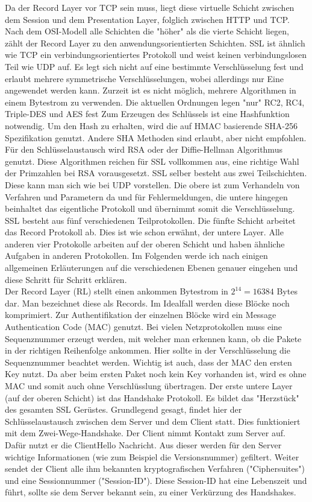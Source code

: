 Da der Record Layer vor TCP sein muss, liegt diese virtuelle Schicht zwischen dem Session und dem Presentation Layer, folglich zwischen HTTP und TCP. Nach dem OSI-Modell alle Schichten die "höher" als die vierte Schicht liegen, zählt der Record Layer zu den anwendungsorientierten Schichten. SSL ist ähnlich wie TCP ein verbindungsorientiertes Protokoll und weist keinen verbindungslosen Teil wie UDP auf. Es legt sich nicht auf eine bestimmte Verschlüsselung fest und erlaubt mehrere symmetrische Verschlüsselungen, wobei allerdings nur Eine angewendet werden kann. Zurzeit ist es nicht möglich, mehrere Algorithmen in einem Bytestrom zu verwenden. Die aktuellen Ordnungen legen "nur" RC2, RC4, Triple-DES und AES fest Zum Erzeugen des Schlüssels ist eine Hashfunktion notwendig. Um den Hash zu erhalten, wird die auf HMAC basierende SHA-256 Spezifikation genutzt. Andere SHA Methoden sind erlaubt, aber nicht empfohlen. Für den Schlüsselaustausch wird RSA oder der Diffie-Hellman Algorithmus genutzt. Diese Algorithmen reichen für SSL vollkommen aus, eine richtige Wahl der Primzahlen bei RSA vorausgesetzt. SSL selber besteht aus zwei Teilschichten. Diese kann man sich wie bei UDP vorstellen. Die obere ist zum Verhandeln von Verfahren und Parametern da und für Fehlermeldungen, die untere hingegen beinhaltet das eigentliche Protokoll und übernimmt somit die Verschlüsselung.
SSL besteht aus fünf verschiedenen Teilprotokollen. Die fünfte Schicht arbeitet das Record Protokoll ab. Dies ist wie schon erwähnt, der untere Layer. Alle anderen vier Protokolle arbeiten auf der oberen Schicht und haben ähnliche Aufgaben in anderen Protokollen. Im Folgenden werde ich nach einigen allgemeinen Erläuterungen auf die verschiedenen Ebenen genauer eingehen und diese Schritt für Schritt erklären.\\
Der Record Layer (RL) stellt einen ankommen Bytestrom in $2^14 = 16384$ Bytes dar. Man bezeichnet diese als Records. Im Idealfall werden diese Blöcke noch komprimiert. Zur Authentifikation der einzelnen Blöcke wird ein Message Authentication Code (MAC) genutzt. Bei vielen Netzprotokollen muss eine Sequenznummer erzeugt werden, mit welcher man erkennen kann, ob die Pakete in der richtigen Reihenfolge ankommen. Hier sollte in der Verschlüsselung die Sequenznummer beachtet werden. Wichtig ist auch, dass der MAC den ersten Key nutzt. Da aber beim ersten Paket noch kein Key vorhanden ist, wird es ohne MAC und somit auch ohne Verschlüsslung übertragen. Der erste untere Layer (auf der oberen Schicht) ist das Handshake Protokoll. Es bildet das "Herzstück" des gesamten SSL Gerüstes. Grundlegend gesagt, findet hier der Schlüsselaustausch zwischen dem Server und dem Client statt. Dies funktioniert mit dem Zwei-Wege-Handshake. Der Client nimmt Kontakt zum Server auf. Dafür nutzt er die ClientHello Nachricht. Aus dieser werden für den Server wichtige Informationen (wie zum Beispiel die Versionsnummer) gefiltert.
Weiter sendet der Client alle ihm bekannten kryptografischen Verfahren ("Ciphersuites") und eine Sessionnummer ("Session-ID"). Diese Session-ID hat eine Lebenszeit und führt, sollte sie dem Server bekannt sein, zu einer Verkürzung des Handshakes.\\

